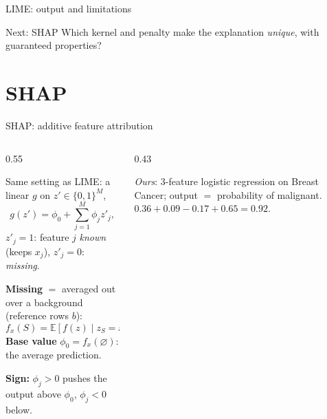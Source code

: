 \documentclass[aspectratio=169,11pt]{beamer}
\begin{document}
\begin{frame}{LIME: output and limitations}
  \pause
  \begin{block}{Next: SHAP}
    Which kernel and penalty make the explanation \emph{unique},
    with guaranteed properties?
  \end{block}
\end{frame}

\section{SHAP}

\begin{frame}{SHAP: additive feature attribution}
  \begin{columns}[T]
    \begin{column}{0.55\textwidth}
      {\small
      Same setting as LIME: a linear $g$ on $z'\in\{0,1\}^M$,
      \[
        g(z')=\phi_0+\sum_{j=1}^{M}\phi_j z'_j ,
      \]
      $z'_j=1$: feature $j$ \emph{known} (keeps $x_j$),
      $z'_j=0$: \emph{missing}.

      \pause
      \vspace{0.3em}
      \textbf{Missing} $=$ averaged out over a background
      (reference rows $b$):
      \[
        f_x(S)=\mathbb{E}[f(z)\mid z_S=x_S]
        \approx\mathbb{E}_b\bigl[f(x_S,b_{\bar S})\bigr].
      \]
      \textbf{Base value} $\phi_0=f_x(\varnothing)$:
      the average prediction.

      \pause
      \vspace{0.3em}
      \textbf{Sign:} $\phi_j>0$ pushes the output above $\phi_0$,
      $\phi_j<0$ below.
      }
    \end{column}
    \begin{column}{0.43\textwidth}
      \pause
      \centering

      {\scriptsize \emph{Ours}: 3-feature logistic regression on
      Breast Cancer; output $=$ probability of malignant.
      $0.36+0.09-0.17+0.65=0.92$.}
    \end{column}
  \end{columns}
\end{frame}
\end{document}
